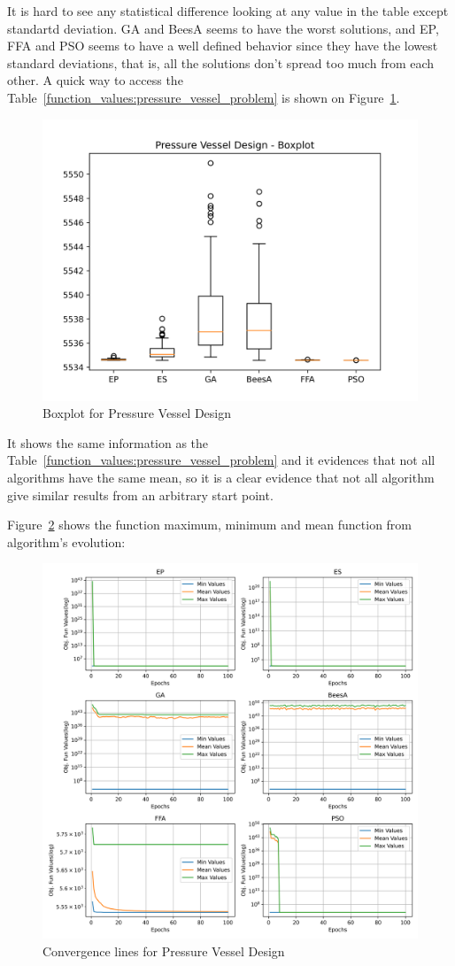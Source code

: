 \documentclass[conference]{IEEEtran}
\begin{document}
It is hard to see any statistical  difference looking at any value in the table except standartd deviation.
GA and BeesA seems to have the worst solutions, and EP, FFA and PSO seems to have a well defined behavior
since they have the lowest standard deviations, that is, all the solutions don't spread too much from each
other.
A quick way to access the Table~\ref{function_values:pressure_vessel_problem} is shown on Figure~\ref{fig:pressure_vessel_design_boxplot}.

\begin{figure}[H]
\centering
\caption{Boxplot for Pressure Vessel Design}
\label{fig:pressure_vessel_design_boxplot}
\includegraphics[scale=0.5]{images/pressure_vessel_problem_boxplot.png}
\end{figure}

It shows the same information as the Table~\ref{function_values:pressure_vessel_problem}
and it evidences that not all algorithms have the same mean, so it is a clear evidence
that not all algorithm give similar results from an arbitrary start point.

Figure~\ref{fig:pressure_vessel_problem_convergence} shows the
function maximum, minimum and mean function from algorithm's evolution:

\begin{figure}[H]
\centering
\caption{Convergence lines for Pressure Vessel Design}
\label{fig:pressure_vessel_problem_convergence}
\includegraphics[width=0.4 \textwidth]{images/pressure_vessel_problem_convergence.png}
\end{figure}
\end{document}
